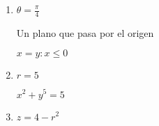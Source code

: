 \documentclass[../practica_09.tex]{subfiles}
\begin{document}
    \begin{enumerate}
        \item $ \theta = \frac{\pi}{4} $
        
            Un plano que pasa por el origen

            $ x = y : x \leq 0 $

        \item $r = 5 $

            $ x^2 + y^5 = 5$

        \item  $z=4-r^2$

    \end{enumerate}
\end{document}
